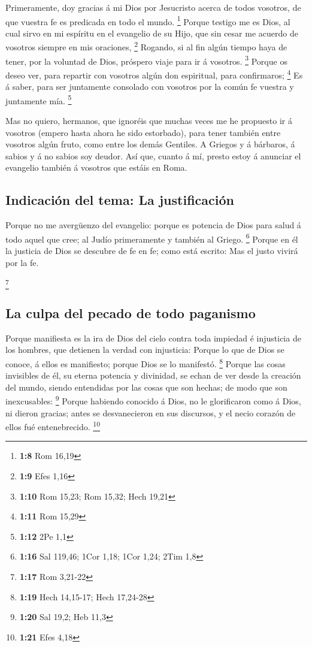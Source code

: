  Primeramente, doy gracias á mi Dios por Jesucristo acerca
de todos vosotros, de que vuestra fe es predicada en todo el mundo.
\footnote{\textbf{1:8} Rom 16,19}  Porque testigo me es
Dios, al cual sirvo en mi espíritu en el evangelio de su Hijo, que sin
cesar me acuerdo de vosotros siempre en mis oraciones, \footnote{\textbf{1:9}
  Efes 1,16}  Rogando, si al fin algún tiempo haya de
tener, por la voluntad de Dios, próspero viaje para ir á vosotros.
\footnote{\textbf{1:10} Rom 15,23; Rom 15,32; Hech 19,21}
 Porque os deseo ver, para repartir con vosotros algún
don espiritual, para confirmaros; \footnote{\textbf{1:11} Rom 15,29}
 Es á saber, para ser juntamente consolado con vosotros
por la común fe vuestra y juntamente mía. \footnote{\textbf{1:12} 2Pe
  1,1}

 Mas no quiero, hermanos, que ignoréis que muchas veces
me he propuesto ir á vosotros (empero hasta ahora he sido estorbado),
para tener también entre vosotros algún fruto, como entre los demás
Gentiles.  A Griegos y á bárbaros, á sabios y á no sabios
soy deudor.  Así que, cuanto á mí, presto estoy á
anunciar el evangelio también á vosotros que estáis en Roma.

\hypertarget{indicaciuxf3n-del-tema-la-justificaciuxf3n}{%
\subsection{Indicación del tema: La
justificación}\label{indicaciuxf3n-del-tema-la-justificaciuxf3n}}

 Porque no me avergüenzo del evangelio: porque es
potencia de Dios para salud á todo aquel que cree; al Judío primeramente
y también al Griego. \footnote{\textbf{1:16} Sal 119,46; 1Cor 1,18; 1Cor
  1,24; 2Tim 1,8}  Porque en él la justicia de Dios se
descubre de fe en fe; como está escrito: Mas el justo vivirá por la fe.

\footnote{\textbf{1:17} Rom 3,21-22}

\hypertarget{la-culpa-del-pecado-de-todo-paganismo}{%
\subsection{La culpa del pecado de todo
paganismo}\label{la-culpa-del-pecado-de-todo-paganismo}}

 Porque manifiesta es la ira de Dios del cielo contra
toda impiedad é injusticia de los hombres, que detienen la verdad con
injusticia:  Porque lo que de Dios se conoce, á ellos es
manifiesto; porque Dios se lo manifestó. \footnote{\textbf{1:19} Hech
  14,15-17; Hech 17,24-28}  Porque las cosas invisibles
de él, su eterna potencia y divinidad, se echan de ver desde la creación
del mundo, siendo entendidas por las cosas que son hechas; de modo que
son inexcusables: \footnote{\textbf{1:20} Sal 19,2; Heb 11,3}
 Porque habiendo conocido á Dios, no le glorificaron como
á Dios, ni dieron gracias; antes se desvanecieron en sus discursos, y el
necio corazón de ellos fué entenebrecido. \footnote{\textbf{1:21} Efes
  4,18}


